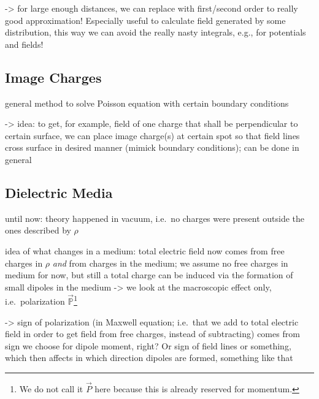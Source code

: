 \documentclass[../class_mech_main.tex]{subfiles}
\begin{document}
-> for large enough distances, we can replace with first/second order to really good approximation! Especially useful to calculate field generated by some distribution, this way we can avoid the really nasty integrals, e.g., for potentials and fields!



        \subsection{Image Charges}
general method to solve Poisson equation with certain boundary conditions

-> idea: to get, for example, field of one charge that shall be perpendicular to certain surface, we can place image charge(s) at certain spot so that field lines cross surface in desired manner (mimick boundary conditions); can be done in general



        \subsection{Dielectric Media}

until now: theory happened in vacuum, i.e.~no charges were present outside the ones described by $\rho$

idea of what changes in a medium: total electric field now comes from free charges in $\rho$ \emph{and} from charges in the medium; we assume no free charges in medium for now, but still a total charge can be induced via the formation of small dipoles in the medium -> we look at the macroscopic effect only, i.e.~polarization $\vec{\mathbb{P}}$\footnote{We do not call it $\vec{P}$ here because this is already reserved for momentum.}

-> sign of polarization (in Maxwell equation; i.e.~that we add to total electric field in order to get field from free charges, instead of subtracting) comes from sign we choose for dipole moment, right? Or sign of field lines or something, which then affects in which direction dipoles are formed, something like that
\end{document}
